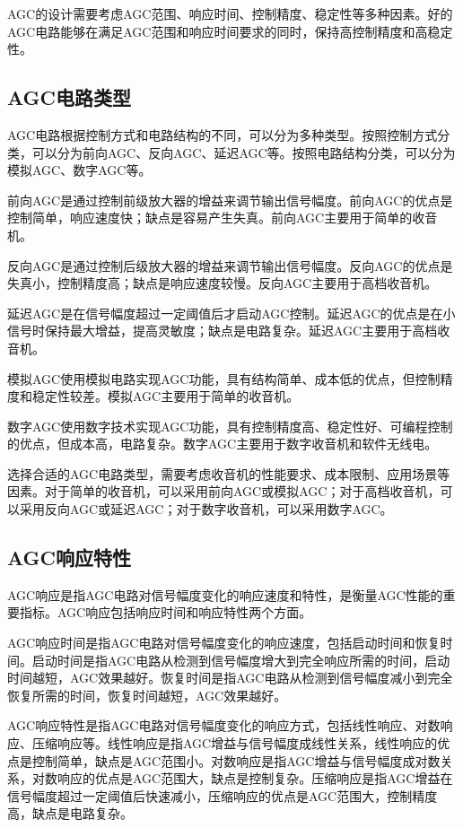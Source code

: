 \documentclass[12pt,UTF8]{ctexbook}
\begin{document}
AGC的设计需要考虑AGC范围、响应时间、控制精度、稳定性等多种因素。好的AGC电路能够在满足AGC范围和响应时间要求的同时，保持高控制精度和高稳定性。

\subsection{AGC电路类型}

AGC电路根据控制方式和电路结构的不同，可以分为多种类型。按照控制方式分类，可以分为前向AGC、反向AGC、延迟AGC等。按照电路结构分类，可以分为模拟AGC、数字AGC等。

前向AGC是通过控制前级放大器的增益来调节输出信号幅度。前向AGC的优点是控制简单，响应速度快；缺点是容易产生失真。前向AGC主要用于简单的收音机。

反向AGC是通过控制后级放大器的增益来调节输出信号幅度。反向AGC的优点是失真小，控制精度高；缺点是响应速度较慢。反向AGC主要用于高档收音机。

延迟AGC是在信号幅度超过一定阈值后才启动AGC控制。延迟AGC的优点是在小信号时保持最大增益，提高灵敏度；缺点是电路复杂。延迟AGC主要用于高档收音机。

模拟AGC使用模拟电路实现AGC功能，具有结构简单、成本低的优点，但控制精度和稳定性较差。模拟AGC主要用于简单的收音机。

数字AGC使用数字技术实现AGC功能，具有控制精度高、稳定性好、可编程控制的优点，但成本高，电路复杂。数字AGC主要用于数字收音机和软件无线电。

选择合适的AGC电路类型，需要考虑收音机的性能要求、成本限制、应用场景等因素。对于简单的收音机，可以采用前向AGC或模拟AGC；对于高档收音机，可以采用反向AGC或延迟AGC；对于数字收音机，可以采用数字AGC。

\subsection{AGC响应特性}

AGC响应是指AGC电路对信号幅度变化的响应速度和特性，是衡量AGC性能的重要指标。AGC响应包括响应时间和响应特性两个方面。

AGC响应时间是指AGC电路对信号幅度变化的响应速度，包括启动时间和恢复时间。启动时间是指AGC电路从检测到信号幅度增大到完全响应所需的时间，启动时间越短，AGC效果越好。恢复时间是指AGC电路从检测到信号幅度减小到完全恢复所需的时间，恢复时间越短，AGC效果越好。

AGC响应特性是指AGC电路对信号幅度变化的响应方式，包括线性响应、对数响应、压缩响应等。线性响应是指AGC增益与信号幅度成线性关系，线性响应的优点是控制简单，缺点是AGC范围小。对数响应是指AGC增益与信号幅度成对数关系，对数响应的优点是AGC范围大，缺点是控制复杂。压缩响应是指AGC增益在信号幅度超过一定阈值后快速减小，压缩响应的优点是AGC范围大，控制精度高，缺点是电路复杂。
\end{document}
